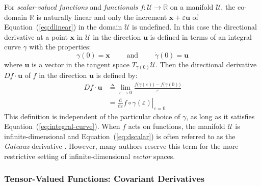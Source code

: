 For \emph{scalar-valued functions} and \emph{functionals}
\(f\colon \mathcal{U}\rightarrow \mathbb{R}\) on a manifold
\(\mathcal{U}\), the co-domain \(\mathbb{R}\) is naturally linear and
only the increment \(\boldsymbol{x}+\varepsilon \boldsymbol{u}\) of Equation~(\ref{eq:dlinear}) in
the domain \(\mathcal{U}\) is undefined.
In this case the directional derivative at a point \(\boldsymbol{x}\) in \(\mathcal{U}\) in the direction
\(\boldsymbol{u}\) is defined in terms of an integral curve \(\gamma\) with the properties:
\begin{equation}
  \gamma(0)=\boldsymbol{x}
  \qquad\text{ and }\qquad
  \dot{\gamma}(0)=\boldsymbol{u}
  \label{eq:integral-curve}
\end{equation} 
where \(\boldsymbol{u}\) is a vector in the tangent space \(T_{\gamma(0)}\mathcal{U}\).
Then the directional derivative \(D f\cdot\boldsymbol{u}\) of \(f\)
in the direction \(\boldsymbol{u}\) is defined by: 
\begin{equation}
\begin{aligned}
D f\cdot \boldsymbol{u} 
  &\triangleq \lim _{\varepsilon \rightarrow 0} \frac{f\bigl(\gamma(\varepsilon)\bigr)-f\bigl(\gamma\left(0\right)\bigr)}{\varepsilon} \\
&=\left.\frac{\mathrm{d}}{\mathrm{d} \varepsilon}  f \circ \gamma(\varepsilon) \right|_{\varepsilon=0}
\end{aligned}
\label{eq:dscalar}
\end{equation}
%
This definition is independent of the
particular choice of \(\gamma\), as long as it satisfies
Equation~(\ref{eq:integral-curve}).
When \(f\) acts on functions,
the manifold \(\mathcal{U}\) is infinite-dimensional and Equation~(\ref{eq:dscalar}) is often
referred to as the \emph{Gateaux} derivative \citep{simo1992symmetric,zienkiewicz2014finite}. However, many authors reserve this term for the more restrictive setting of infinite-dimensional \emph{vector} spaces.

\hypertarget{covariant-derivatives}{%
\subsubsection{Tensor-Valued Functions: Covariant Derivatives}\label{covariant-derivatives}}

